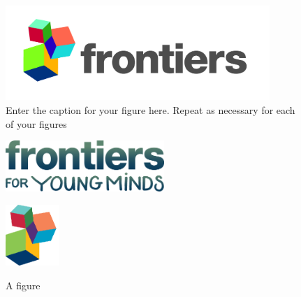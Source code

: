 \documentclass[utf8]{frontiers_suppmat} %
\begin{document}
\begin{figure}[h!]
\begin{center}
\includegraphics[width=10cm]{logo1}%
\end{center}
\caption{ Enter the caption for your figure here.  Repeat as  necessary for each of your figures}\label{fig:1}
\end{figure}


\begin{figure}[h!]
\begin{minipage}[b]{.5\linewidth}
\centering\includegraphics[width=6cm]{YM-logo}%
\label{fig:2a}
\end{minipage}%
\begin{minipage}[b]{.5\linewidth}
\centering\includegraphics[width=2cm]{logo2}%
\label{fig:2b}
\end{minipage}
\caption{A figure}\label{fig:2b}
\end{figure}




%
\end{document}
